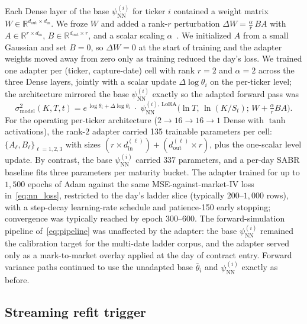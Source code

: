 Each Dense layer of the base $\psi_{\text{NN}}^{(i)}$ for ticker $i$ contained a weight matrix $W \in \mathbb{R}^{d_{\text{out}} \times d_{\text{in}}}$. We froze $W$ and added a rank-$r$ perturbation $\Delta W = \tfrac{\alpha}{r}\, B A$ with $A \in \mathbb{R}^{r \times d_{\text{in}}}$, $B \in \mathbb{R}^{d_{\text{out}} \times r}$, and a scalar scaling $\alpha$~\cite{hu2022lora}. We initialized $A$ from a small Gaussian and set $B = 0$, so $\Delta W = 0$ at the start of training and the adapter weights moved away from zero only as training reduced the day's loss. We trained one adapter per (ticker, capture-date) cell with rank $r = 2$ and $\alpha = 2$ across the three Dense layers, jointly with a scalar update $\Delta\log\theta_i$ on the per-ticker level; the architecture mirrored the base $\psi_{\text{NN}}^{(i)}$ exactly so the adapted forward pass was
\begin{equation}\label{eq:lora_forward}
    \sigma^2_{\text{model}}(K, T, t) = e^{\,\log\theta_i + \Delta\log\theta_i} \;\cdot\; \psi_{\text{NN}}^{(i),\,\text{LoRA}}\!\bigl(\ln T,\,\ln(K/S_t);\, W + \tfrac{\alpha}{r} B A\bigr).
\end{equation}
For the operating per-ticker architecture ($2 \to 16 \to 16 \to 1$ Dense with $\tanh$ activations), the rank-$2$ adapter carried 135 trainable parameters per cell: $\{A_\ell, B_\ell\}_{\ell=1,2,3}$ with sizes $(r{\times}d_{\text{in}}^{(\ell)}) + (d_{\text{out}}^{(\ell)}{\times}r)$, plus the one-scalar level update. By contrast, the base $\psi_{\text{NN}}^{(i)}$ carried $337$ parameters, and a per-day SABR baseline fits three parameters per maturity bucket. The adapter trained for up to $1{,}500$ epochs of Adam against the same MSE-against-market-IV loss in~\eqref{eq:nn_loss}, restricted to the day's ladder slice (typically $200$--$1{,}000$ rows), with a step-decay learning-rate schedule and patience-150 early stopping; convergence was typically reached by epoch 300--600. The forward-simulation pipeline of~\eqref{eq:pipeline} was unaffected by the adapter: the base $\psi_{\text{NN}}^{(i)}$ remained the calibration target for the multi-date ladder corpus, and the adapter served only as a mark-to-market overlay applied at the day of contract entry. Forward variance paths continued to use the unadapted base $\bar\theta_i$ and $\psi_{\text{NN}}^{(i)}$ exactly as before.

\subsection{Streaming refit trigger}\label{sec:lora_trigger}

